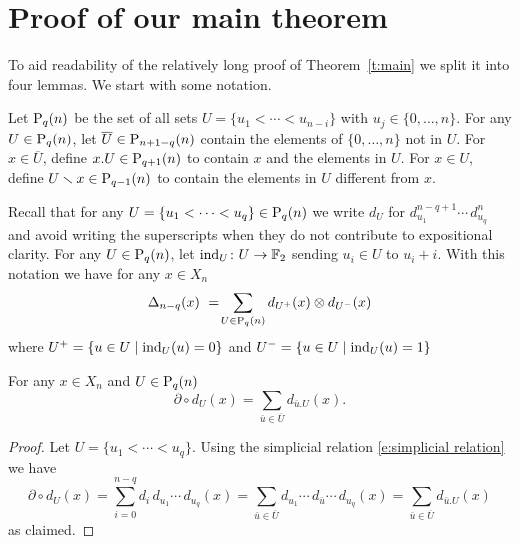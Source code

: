 
\section{Proof of our main theorem} \label{s:proof}

To aid readability of the relatively long proof of Theorem~\ref{t:main} we split it into four lemmas.
We start with some notation.

\begin{definition}
	Let $\P_q(n)$ be the set of all sets $U = \{u_1 < \cdots < u_{n-i}\}$ with $u_j \in \{0, \dots, n\}$.
	For any $U \in \P_q(n)$, let $\overline{U} \in \P_{n+1-q}(n)$ contain the elements of $\{0, \dots, n\}$ not in $U$. For $x \in \overline{U}$, define $x.U \in \P_{q+1}(n)$ to contain $x$ and the elements in $U$.
	For $x \in U$, define $U \sm x \in \P_{q-1}(n)$ to contain the elements in $U$ different from $x$.
\end{definition}

Recall that for any $U = \{u_1 < \cdots < u_q\} \in \P_q(n)$ we write $d_U$ for $d_{u_1}^{n-q+1} \cdots \,d_{u_q}^n$ and avoid writing the superscripts when they do not contribute to expositional clarity.
For any $U \in \P_q(n)$, let $\ind_U \colon U \to \F_2$ sending $u_i \in U$ to $u_i + i$.
With this notation we have for any $x \in X_n$
\begin{equation*}
\Delta_{n-q}(x)\ =\! \sum_{U \in \P_q(n)} d_{U^+}(x) \otimes d_{U^-}(x)
\end{equation*}
where $U^+ = \{u \in U \mid \ind_U(u) = 0\}$ and $U^- = \{u \in U \mid \ind_U(u) = 1\}$

\begin{lemma} \label{l:partial dU = dxU}
	For any $x \in X_n$ and $U \in \P_{q}(n)$
	\begin{equation} \label{lemma1: existence: eq1}
	\partial \circ d_U(x) = \sum_{\bar{u} \in \overline{U}} d_{\bar{u}.U}(x).
	\end{equation}
\end{lemma}

\begin{proof}
	Let $U = \{u_1 < \cdots < u_q\}$. Using the simplicial relation \eqref{e:simplicial relation} we have
	\begin{equation*}
	\partial \circ d_U(x) = 
	\sum_{i=0}^{n-q} d_i\, d_{u_1} \cdots\, d_{u_q}(x) = 
	\sum_{\bar{u} \in \overline{U}} d_{u_1} \cdots\, d_{\bar{u}} \cdots\, d_{u_q}(x) =
	\sum_{\bar{u} \in \overline{U}} d_{\bar{u}.U}(x)
	\end{equation*}
	as claimed.
\end{proof}

